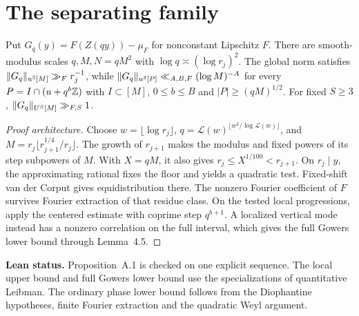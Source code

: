 \section{The separating family}

\begin{proposition}\label{p:separating-family}
\leanok
{}
Put $G_q(y)=F(Z(qy))-\mu_F$ for nonconstant Lipschitz $F$.
There are smooth-modulus scales $q,M,N=qM^2$ with
$\log q\asymp(\log r_j)^2$. The global norm satisfies
$\lVert G_q\rVert_{u^3[M]}\gg_F r_j^{-1}$, while
$\lVert G_q\rVert_{u^3[P]}\ll_{A,B,F}(\log M)^{-A}$ for every
$P=I\cap(u+q^b\mathbb Z)$ with $I\subset[M]$, $0\le b\le B$ and
$|P|\ge(qM)^{1/2}$. For fixed $S\ge3$,
$\lVert G_q\rVert_{U^S[M]}\gg_{F,S}1$.
\end{proposition}
\begin{proof}[Proof architecture]
\leanok
Choose $w=\lfloor\log r_j\rfloor$,
$q=\mathcal L(w)^{\lfloor w^2/\log\mathcal L(w)\rfloor}$,
and $M=r_j\lfloor r_{j+1}^{1/4}/r_j\rfloor$. The growth of
$r_{j+1}$ makes the modulus and fixed powers of its step
subpowers of $M$. With $X=qM$, it also gives
$r_j\le X^{1/100}<r_{j+1}$. On $r_j\mid y$, the approximating
rational fixes the floor and yields a quadratic test. Fixed-shift
van der Corput gives equidistribution there. The nonzero Fourier
coefficient of $F$ survives Fourier extraction of that residue class.
On the tested local progressions, apply the centered estimate
with coprime step $q^{b+1}$. A localized vertical mode instead
has a nonzero correlation on the full interval, which gives the
full Gowers lower bound through Lemma~4.5.
\end{proof}
\noindent\textbf{Lean status.} Proposition~A.1 is checked on one
explicit sequence. The local upper bound and full Gowers lower bound use the
specializations of quantitative Leibman. The ordinary phase lower
bound follows from the Diophantine hypotheses, finite Fourier
extraction and the quadratic Weyl argument.

